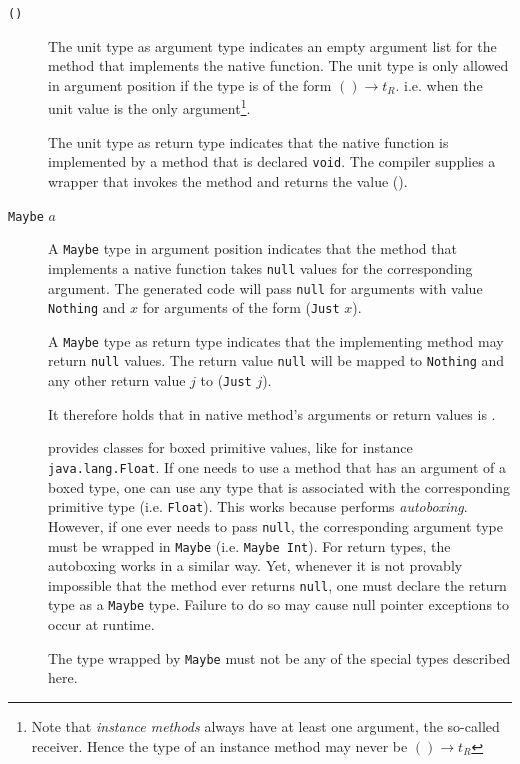 \begin{description}
\item[\texttt{()}] The unit type as argument type indicates an empty argument list for the \java{} method that implements the native function. The unit type is only allowed in argument position if the type is of the form $() \rightarrow t_R$. i.e. when the unit value is the only argument\footnote{Note that \emph{instance methods} always have at least one argument, the so-called receiver. Hence the \frege{} type of an instance method may never be $() \rightarrow t_R$}.

The unit type as return type indicates that the native function is implemented by a \java{} method that is declared \texttt{void}. The compiler supplies a wrapper that invokes the method and returns the value ().

\item[\texttt{Maybe} $a$] A \texttt{Maybe} type in argument position indicates that the \java{} method that implements a native function takes \texttt{null} values for the corresponding argument. The generated code will pass \texttt{null} for arguments with value \texttt{Nothing} and $x$ for arguments of the form (\texttt{Just} $x$).

A \texttt{Maybe} type as return type indicates that the implementing method may return \texttt{null} values. The return value \texttt{null} will be mapped to \texttt{Nothing} and any other return value $j$ to (\texttt{Just} $j$).

It therefore holds that  in native method's arguments or return values is .

\java{} provides classes for boxed primitive values, like for instance \texttt{java.lang.Float}. 
If one needs to use a method that has an argument of a boxed type, 
one can use any \frege{} type that is associated with the corresponding  primitive type (i.e. \texttt{Float}). 
This works because \java{} performs \emph{autoboxing}. 
However, if one ever needs to pass \texttt{null}, the corresponding argument type must be wrapped in \texttt{Maybe} (i.e. \texttt{Maybe Int}). 
For return types, the autoboxing works in a similar way. 
Yet, whenever it is not provably impossible that the method ever returns \texttt{null}, 
one must declare the return type as a \texttt{Maybe} type. 
Failure to do so may cause null pointer exceptions to occur at runtime.

The type wrapped by \texttt{Maybe} must not be any of the special types described here.


\end{description}
